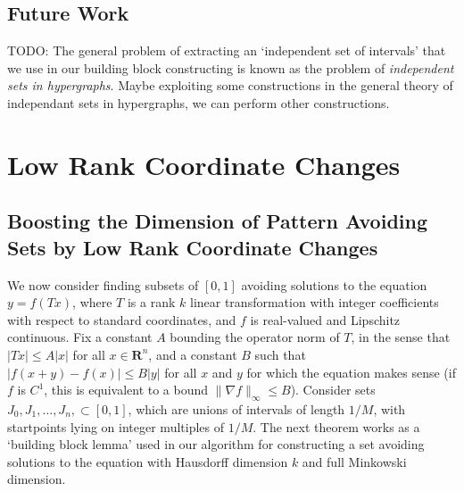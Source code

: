 \documentclass{report}
\theoremstyle{plain}
\theoremstyle{plain}
\begin{document}
\section{Future Work}

TODO: The general problem of extracting an `independent set of intervals' that we use in our building block constructing is known as the problem of {\it independent sets in hypergraphs}. Maybe exploiting some constructions in the general theory of independant sets in hypergraphs, we can perform other constructions.

\chapter{Low Rank Coordinate Changes}

\section{Boosting the Dimension of Pattern Avoiding Sets by Low Rank Coordinate Changes}

We now consider finding subsets of $[0,1]$ avoiding solutions to the equation $y = f(Tx)$, where $T$ is a rank $k$ linear transformation with integer coefficients with respect to standard coordinates, and $f$ is real-valued and Lipschitz continuous. Fix a constant $A$ bounding the operator norm of $T$, in the sense that $|Tx| \leq A|x|$ for all $x \in \mathbf{R}^n$, and a constant $B$ such that $|f(x+y) - f(x)| \leq B|y|$ for all $x$ and $y$ for which the equation makes sense (if $f$ is $C^1$, this is equivalent to a bound $\| \nabla f \|_\infty \leq B$). Consider sets $J_0, J_1, \dots, J_n, \subset [0,1]$, which are unions of intervals of length $1/M$, with startpoints lying on integer multiples of $1/M$. The next theorem works as a `building block lemma' used in our algorithm for constructing a set avoiding solutions to the equation with Hausdorff dimension $k$ and full Minkowski dimension.
\end{document}
